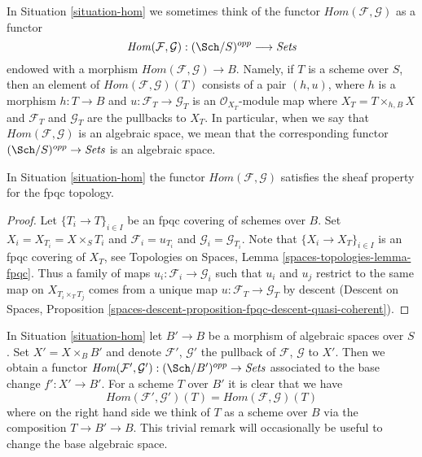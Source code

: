 \noindent
In Situation \ref{situation-hom} we sometimes think of the functor
$\mathit{Hom}(\mathcal{F}, \mathcal{G})$ as a functor
$$
\mathit{Hom}(\mathcal{F}, \mathcal{G}) :
(\Sch/S)^{opp}
\longrightarrow
\textit{Sets}
$$
endowed with a morphism
$\mathit{Hom}(\mathcal{F}, \mathcal{G}) \to B$.
Namely, if $T$ is a scheme over $S$, then an element of
$\mathit{Hom}(\mathcal{F}, \mathcal{G})(T)$ consists of a pair
$(h, u)$, where $h$ is a morphism $h : T \to B$ and
$u : \mathcal{F}_T \to \mathcal{G}_T$ is an $\mathcal{O}_{X_T}$-module
map where $X_T = T \times_{h, B} X$ and $\mathcal{F}_T$ and $\mathcal{G}_T$
are the pullbacks to $X_T$. In particular, when we say
that $\mathit{Hom}(\mathcal{F}, \mathcal{G})$ is an algebraic space,
we mean that the corresponding functor
$(\Sch/S)^{opp} \to \textit{Sets}$ is an algebraic space.

\begin{lemma}
\label{lemma-hom-sheaf}
In Situation \ref{situation-hom} the functor
$\mathit{Hom}(\mathcal{F}, \mathcal{G})$ 
satisfies the sheaf property for the fpqc topology.
\end{lemma}

\begin{proof}
Let $\{T_i \to T\}_{i \in I}$ be an fpqc covering of schemes over $B$.
Set $X_i = X_{T_i} = X \times_S T_i$ and $\mathcal{F}_i = u_{T_i}$
and $\mathcal{G}_i = \mathcal{G}_{T_i}$.
Note that $\{X_i \to X_T\}_{i \in I}$ is an fpqc covering of $X_T$, see
Topologies on Spaces, Lemma \ref{spaces-topologies-lemma-fpqc}.
Thus a family of maps $u_i : \mathcal{F}_i \to \mathcal{G}_i$
such that $u_i$ and $u_j$ restrict to the same map on
$X_{T_i \times_T T_j}$ comes from a unique map
$u : \mathcal{F}_T \to \mathcal{G}_T$ by descent
(Descent on Spaces, Proposition
\ref{spaces-descent-proposition-fpqc-descent-quasi-coherent}).
\end{proof}

\begin{remark}
\label{remark-hom-base-change}
In Situation \ref{situation-hom} let $B' \to B$ be a morphism of
algebraic spaces over $S$. Set $X' = X \times_B B'$ and denote
$\mathcal{F}'$, $\mathcal{G}'$ the pullback of
$\mathcal{F}$, $\mathcal{G}$ to $X'$. Then we obtain a functor
$\mathit{Hom}(\mathcal{F}', \mathcal{G}') : (\Sch/B')^{opp} \to \textit{Sets}$
associated to the base change $f' : X' \to B'$. For a scheme $T$ over $B'$
it is clear that we have
$$
\mathit{Hom}(\mathcal{F}', \mathcal{G}')(T) =
\mathit{Hom}(\mathcal{F}, \mathcal{G})(T)
$$
where on the right hand side we think of $T$ as a scheme over $B$
via the composition $T \to B' \to B$. This trivial remark
will occasionally be useful to change the base algebraic space.
\end{remark}

